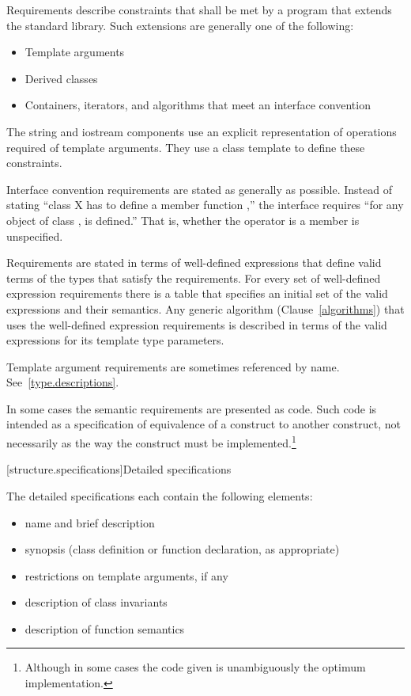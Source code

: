 \pnum
{}%
Requirements describe constraints that shall be met by a \Cpp program that extends the standard library.
Such extensions are generally one of the following:

\begin{itemize}
\item Template arguments
\item Derived classes
\item Containers, iterators, and algorithms that meet an interface convention
\end{itemize}

\pnum
The string and iostream components use an explicit representation of operations
required of template arguments. They use a class template  to
define these constraints.

\pnum
Interface convention requirements are stated as generally as possible. Instead
of stating ``class X has to define a member function ,'' the
interface requires ``for any object  of class ,  is
defined.'' That is, whether the operator is a member is unspecified.

\pnum
Requirements are stated in terms of well-defined expressions that define valid terms of
the types that satisfy the requirements. For every set of well-defined expression
requirements there is a table that specifies an initial set of the valid expressions and
their semantics. Any generic algorithm (Clause~\ref{algorithms}) that uses the
well-defined expression requirements is described in terms of the valid expressions for
its template type parameters.

\pnum
Template argument requirements are sometimes referenced by name.
See~\ref{type.descriptions}.

\pnum
In some cases the semantic requirements are presented as \Cpp code.
Such code is intended as a
specification of equivalence of a construct to another construct, not
necessarily as the way the construct
must be implemented.\footnote{Although in some cases the code given is
unambiguously the optimum implementation.}

[structure.specifications]{Detailed specifications}

\pnum
The detailed specifications each contain the following elements:%

\begin{itemize}
\item name and brief description
\item synopsis (class definition or function declaration, as appropriate)
\item restrictions on template arguments, if any
\item description of class invariants
\item description of function semantics
\end{itemize}

